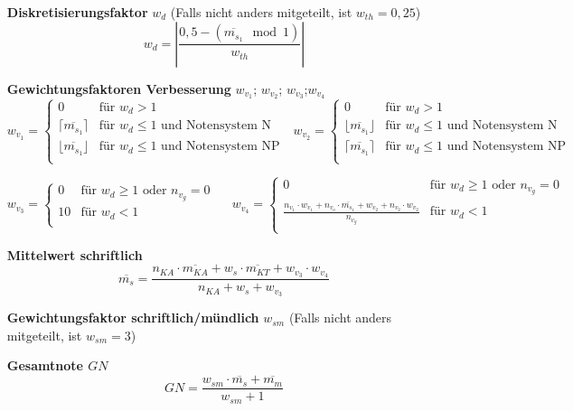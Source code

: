 \documentclass{article}
\begin{document}
\begin{enumerate}[label=\textbf{\textbullet}, align=left, leftmargin=*]
\[	\]
	\item[\textbf{Diskretisierungsfaktor}] $w_{d}$ (Falls nicht anders mitgeteilt, ist $w_{th}=0{,}25$) \cite{wikimodulo,wikibetrag}
	\[
	w_{d} = \left| \frac{0{,}5 - (\overline{m_{s_1}} \mod 1)}{w_{th}} \right|
	\]
	\item[\textbf{Gewichtungsfaktoren Verbesserung}] $w_{v_1}$; $w_{v_2}$; $w_{v_3}$;$w_{v_4}$ \cite{wikigaussklammer} \\
	\[
	w_{v_1} =
	\begin{cases}
		0 & \text{für }  w_{d} > 1 \\
		\lceil \overline{m_{s_1}} \rceil & \text{für }    w_{d} \leq 1 \text{ und Notensystem N} \\
		\lfloor \overline{m_{s_1}} \rfloor & \text{für }    w_{d} \leq 1 \text{ und Notensystem NP} \\
	\end{cases}
	\,\,\,\,
	w_{v_2} =
	\begin{cases}
		0 & \text{für }  w_{d} > 1 \\
		\lfloor \overline{m_{s_1}} \rfloor & \text{für }    w_{d} \leq 1 \text{ und Notensystem N} \\
		\lceil \overline{m_{s_1}} \rceil & \text{für }    w_{d} \leq 1 \text{ und Notensystem NP} \\
	\end{cases}
	\]
	
	\[
	w_{v_3} =
	\begin{cases}
		0 & \text{für }  w_{d} \geq 1 \text{ oder } n_{v_g}=0 \\
		10 & \text{für }    w_{d} < 1 \\
	\end{cases}
	\,\,\,\,\,\,\,\,
	w_{v_4} =
	\begin{cases}
		0 & \text{für }  w_{d} \geq 1 \text{ oder } n_{v_g}=0 \\
		\frac{n_{v_1} \cdot w_{v_1} + n_{v_o} \cdot \overline{m_{s_1}} + w_{v_2} + n_{v_2} \cdot w_{v_2}}{n_{v_g}} & \text{für }    w_{d} < 1 \\
	\end{cases}
	\]	
	\item[\textbf{Mittelwert schriftlich}]
	\[
	\overline{m_{s}} = \frac{ n_{KA} \cdot \overline{m_{KA}} + w_s \cdot \overline{m_{KT}} +w_{v_3} \cdot w_{v_4}   }{n_{KA} + w_s + w_{v_3}}
	\]
	\item[\textbf{Gewichtungsfaktor schriftlich/mündlich}] $w_{sm}$ (Falls nicht anders mitgeteilt, ist $w_{sm}=3$)
	\item[\textbf{Gesamtnote $GN$}]
	\[
	GN = \frac{w_{sm} \cdot \overline{m_{s}} + \overline{m_{m}}}{w_{sm}+1}
	\]
\end{enumerate}

\renewcommand\refname{\normalsize Quellen}
\renewcommand{\bibname}{Quellen}

\vfill

\begingroup
\scriptsize


\endgroup
	
\end{document}
